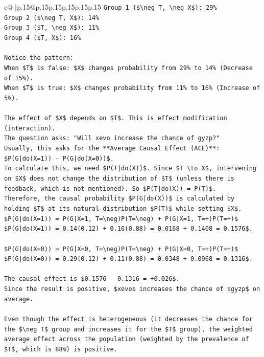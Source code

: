 \documentclass{article}
\begin{document}
{\begin{supertabular}{c@{$\;$}|p{.15\linewidth}@{}p{.15\linewidth}p{.15\linewidth}p{.15\linewidth}p{.15\linewidth}p{.15\linewidth}}
{{{\texttt{Group 1 (\$\textbackslash{}neg T, \textbackslash{}neg X\$): 29\%} \\
\texttt{Group 2 (\$\textbackslash{}neg T, X\$): 14\%} \\
\texttt{Group 3 (\$T, \textbackslash{}neg X\$): 11\%} \\
\texttt{Group 4 (\$T, X\$): 16\%} \\
\\ 
\texttt{Notice the pattern:} \\
\texttt{When \$T\$ is false: \$X\$ changes probability from 29\% to 14\% (Decrease of 15\%).} \\
\texttt{When \$T\$ is true: \$X\$ changes probability from 11\% to 16\% (Increase of 5\%).} \\
\\ 
\texttt{The effect of \$X\$ depends on \$T\$. This is effect modification (interaction).} \\
\texttt{The question asks: "Will xevo increase the chance of gyzp?"} \\
\texttt{Usually, this asks for the **Average Causal Effect (ACE)**: \$P(G|do(X=1)) {-} P(G|do(X=0))\$.} \\
\texttt{To calculate this, we need \$P(T|do(X))\$. Since \$T \textbackslash{}to X\$, intervening on \$X\$ does not change the distribution of \$T\$ (unless there is feedback, which is not mentioned). So \$P(T|do(X)) = P(T)\$.} \\
\texttt{Therefore, the causal probability \$P(G|do(X))\$ is calculated by holding \$T\$ at its natural distribution \$P(T)\$ while setting \$X\$.} \\
\texttt{\$P(G|do(X=1)) = P(G|X=1, T=\textbackslash{}neg)P(T=\textbackslash{}neg) + P(G|X=1, T=+)P(T=+)\$} \\
\texttt{\$P(G|do(X=1)) = 0.14(0.12) + 0.16(0.88) = 0.0168 + 0.1408 = 0.1576\$.} \\
\\ 
\texttt{\$P(G|do(X=0)) = P(G|X=0, T=\textbackslash{}neg)P(T=\textbackslash{}neg) + P(G|X=0, T=+)P(T=+)\$} \\
\texttt{\$P(G|do(X=0)) = 0.29(0.12) + 0.11(0.88) = 0.0348 + 0.0968 = 0.1316\$.} \\
\\ 
\texttt{The causal effect is \$0.1576 {-} 0.1316 = +0.026\$.} \\
\texttt{Since the result is positive, \$xevo\$ increases the chance of \$gyzp\$ on average.} \\
\\ 
\texttt{Even though the effect is heterogeneous (it decreases the chance for the \$\textbackslash{}neg T\$ group and increases it for the \$T\$ group), the weighted average effect across the population (weighted by the prevalence of \$T\$, which is 88\%) is positive.} \\
}}}
\end{supertabular}}
\end{document}

